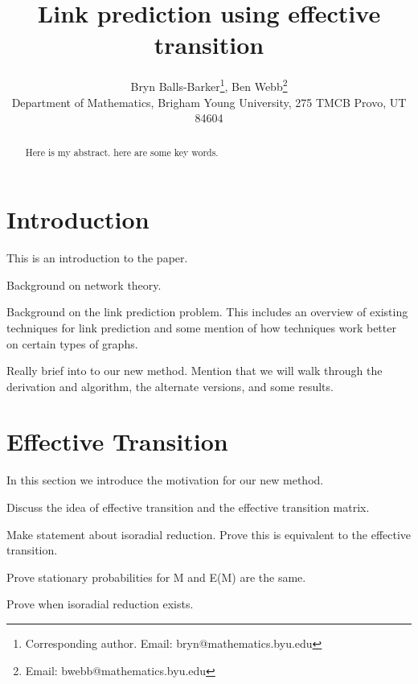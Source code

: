\documentclass{imanum}
\begin{document}
\title{Link prediction using effective transition}

\author{%
{\sc
Bryn Balls-Barker\thanks{Corresponding author. Email: bryn@mathematics.byu.edu},
Ben Webb\thanks{Email: bwebb@mathematics.byu.edu}
} \\[2pt]
Department of Mathematics, Brigham Young University, 275 TMCB Provo, UT 84604
}

\maketitle

\begin{abstract}
{Here is my abstract.}
{here are some key words.}
\end{abstract}


\section{Introduction}
\label{sec;introduction}

This is an introduction to the paper. 

Background on network theory.

Background on the link prediction problem. This includes an overview of existing techniques for link prediction and some mention of how techniques work better on certain types of graphs.

Really brief into to our new method. Mention that we will walk through the derivation and algorithm, the alternate versions, and some results.

\section{Effective Transition}
\label{sec;effectivetransition}

In this section we introduce the motivation for our new method.

Discuss the idea of effective transition and the effective transition matrix. 

Make statement about isoradial reduction. Prove this is equivalent to the effective transition.

Prove stationary probabilities for M and E(M) are the same.

Prove when isoradial reduction exists. 
\end{document}
